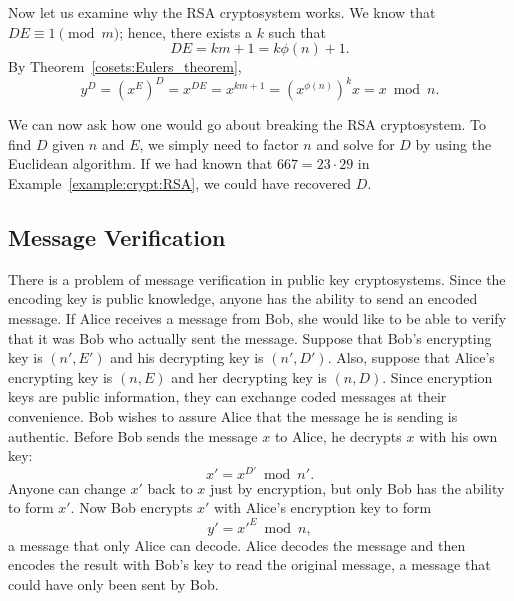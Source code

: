  
 
Now let us examine why the RSA cryptosystem works.  We know that $DE
\equiv 1 \pmod{ m}$; hence, there exists a $k$ such that 
\[
DE = km + 1 = k \phi(n) + 1.
\]
By Theorem~\ref{cosets:Eulers_theorem},
\[
y^D = (x^E)^D = x^{DE} = x^{km+1} = (x^{\phi(n)})^k x = x \bmod n.
\]
 
 
We can now ask how one would go about breaking the RSA cryptosystem.
To find $D$ given $n$ and $E$, we simply need to factor $n$ and solve
for $D$ by using the Euclidean algorithm. If we had known that $667 =
23 \cdot 29$ in Example~\ref{example:crypt:RSA}, we could have recovered $D$.    
 
 
 
\subsection*{Message Verification}
 
 
There is a problem of message verification in public key
cryptosystems. Since the encoding key is public knowledge, anyone has
the ability to send an encoded message.  If Alice receives a message
from Bob, she would like to be able to verify that it was Bob who
actually sent the message. Suppose that Bob's encrypting key is $(n',
E')$ and his decrypting key is $(n', D')$.  Also, suppose that Alice's
encrypting key is $(n, E)$ and her decrypting key is $(n, D)$.  Since
encryption keys are public information, they can exchange coded
messages at their convenience.  Bob wishes to assure Alice that the
message he is sending is authentic. Before Bob sends the message $x$
to Alice, he decrypts  $x$ with his own key:
\[
x' = x ^{D'} \bmod n'.
\]
Anyone can change $x'$ back to $x$ just by encryption, but only Bob
has the ability to form $x'$. Now Bob encrypts $x'$ with Alice's
encryption key to form 
\[
y' = {x'}^E  \bmod n,
\]
a message that only Alice can decode.  Alice decodes the message and
then encodes the result with Bob's key to read the original message, a
message that could have only been sent by Bob.
 
 
 
\histhead
 
